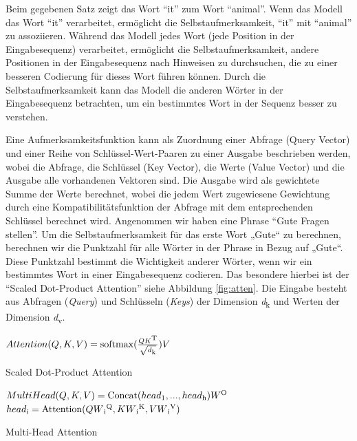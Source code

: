 \documentclass[
        ngerman,
        paper=a4,
        numbers=noendperiod,
]{scrreprt}
\begin{document}
Beim gegebenen Satz zeigt das Wort \enquote{it} zum Wort \enquote{animal}. Wenn das Modell das Wort \enquote{it} verarbeitet, ermöglicht die Selbstaufmerksamkeit, \enquote{it} mit \enquote{animal} zu assoziieren. Während das Modell jedes Wort (jede Position in der Eingabesequenz) verarbeitet, ermöglicht die Selbstaufmerksamkeit, andere Positionen in der Eingabesequenz nach Hinweisen zu durchsuchen, die zu einer besseren Codierung für dieses Wort führen können. Durch die Selbstaufmerksamkeit kann das Modell die anderen Wörter in der Eingabesequenz betrachten, um ein bestimmtes Wort in der Sequenz besser zu verstehen. 

Eine Aufmerksamkeitsfunktion kann als Zuordnung einer Abfrage (Query Vector) und einer Reihe von Schlüssel-Wert-Paaren zu einer Ausgabe beschrieben werden, wobei die Abfrage, die Schlüssel (Key Vector), die Werte (Value Vector) und die Ausgabe alle vorhandenen Vektoren sind. Die Ausgabe wird als gewichtete Summe der Werte berechnet, wobei die jedem Wert zugewiesene Gewichtung durch eine Kompatibilitätsfunktion der Abfrage mit dem entsprechenden Schlüssel berechnet wird. Angenommen wir haben eine Phrase \enquote{Gute Fragen stellen}. Um die Selbstaufmerksamkeit für das erste Wort „Gute“ zu berechnen, berechnen wir die Punktzahl für alle Wörter in der Phrase in Bezug auf „Gute“. Diese Punktzahl bestimmt die Wichtigkeit anderer Wörter, wenn wir ein bestimmtes Wort in einer Eingabesequenz codieren. 
Das besondere hierbei ist der \enquote{Scaled Dot-Product Attention} siehe Abbildung \ref{fig:atten}. Die Eingabe besteht aus Abfragen (\textit{Query}) und Schlüsseln (\textit{Keys}) der Dimension \textit{d}\textsubscript{k} und Werten der Dimension \textit{d}\textsubscript{v}. 





\begin{xequation-} 
\centering ${Attention(Q, K, V)}=\text{softmax}(\frac{QK\textsuperscript{T}}{\sqrt{d\textsubscript{k}}})V $
\caption[Scaled Dot-Product Attention]{Scaled Dot-Product Attention} 
    \label{eqn:SDP}
\end{xequation-} 


\begin{xequation-} 
\centering ${MultiHead(Q, K, V)}=\text{Concat}(head\textsubscript{1},...,head\textsubscript{h})W\textsuperscript{O} $
${head\textsubscript{i}}=\text{Attention}(QW\textsubscript{i}\textsuperscript{Q}, KW\textsubscript{i}\textsuperscript{K}, VW\textsubscript{i}\textsuperscript{V})$
\caption[Multi-Head Attention]{Multi-Head Attention} 
    \label{eqn:SDP}
\end{xequation-} 
\end{document}
